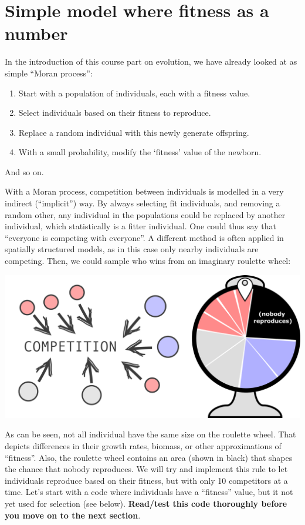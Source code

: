 \documentclass[
  letterpaper,
  DIV=11,
  numbers=noendperiod]{scrreprt}
\providecommand{\tightlist}{%
  \setlength{\itemsep}{0pt}\setlength{\parskip}{0pt}}\usepackage{longtable,booktabs,array}
\theoremstyle{definition}
\theoremstyle{remark}
\begin{document}
\section{Simple model where fitness as a
number}\label{simple-model-where-fitness-as-a-number}

In the introduction of this course part on evolution, we have already
looked at as simple ``Moran process'':

\begin{enumerate}
\def\labelenumi{\arabic{enumi}.}
\tightlist
\item
  Start with a population of individuals, each with a fitness value.
\item
  Select individuals based on their fitness to reproduce.
\item
  Replace a random individual with this newly generate offspring.
\item
  With a small probability, modify the `fitness' value of the newborn.
\end{enumerate}

And so on.

With a Moran process, competition between individuals is modelled in a
very indirect (``implicit'') way. By always selecting fit individuals,
and removing a random other, any individual in the populations could be
replaced by another individual, which statistically is a fitter
individual. One could thus say that ``everyone is competing with
everyone''. A different method is often applied in spatially structured
models, as in this case only nearby individuals are competing. Then, we
could sample who wins from an imaginary roulette wheel:

\includegraphics{images/roulette.png}

As can be seen, not all individual have the same size on the roulette
wheel. That depicts differences in their growth rates, biomass, or other
approximations of ``fitness''. Also, the roulette wheel contains an area
(shown in black) that shapes the chance that nobody reproduces. We will
try and implement this rule to let individuals reproduce based on their
fitness, but with only 10 competitors at a time. Let's start with a code
where individuals have a ``fitness'' value, but it not yet used for
selection (see below). \textbf{Read/test this code thoroughly before you
move on to the next section}.
\end{document}
